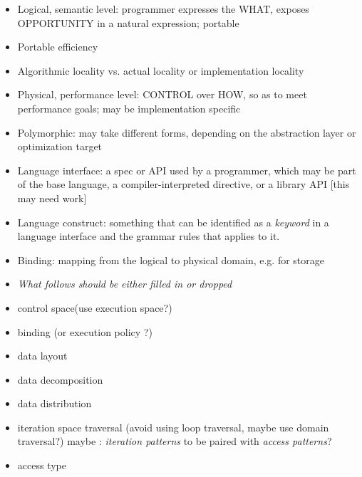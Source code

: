\begin{itemize}
\begin{itemize}
  \item Logical, semantic level: programmer expresses the WHAT, exposes OPPORTUNITY in a natural expression; portable
  \item Portable efficiency
  \item Algorithmic locality vs. actual locality or implementation locality
  \item Physical, performance level: CONTROL over HOW, so as to meet performance goals; may be implementation specific
  \item Polymorphic: may take different forms, depending on the abstraction layer or optimization target
  \item Language interface: a spec or API used by a programmer, which may be part of the base language, a compiler-interpreted directive, or a library API [this may need work] 
  \item Language construct: something that can be identified as a {\em keyword} in a language interface and the grammar rules that applies to it.

  \item Binding: mapping from the logical to physical domain, e.g. for storage
  \item {\em What follows should be either filled in or dropped}
  \item control space(use execution space?)
  \item binding  (or execution policy ?)
  \item data layout
  \item data decomposition 
  \item data distribution 
  \item iteration space traversal (avoid using loop traversal, maybe use domain traversal?) maybe : {\em iteration patterns} to be paired with {\em access patterns}?
  \item access type
  \end{itemize}



\end{itemize}
